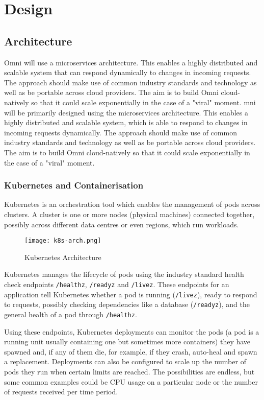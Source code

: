 \chapter{Design}
\label{cha:design}

\section{Architecture}
\label{sec:design-architecture}
Omni will use a microservices architecture. This enables a highly distributed and scalable system that can respond dynamically to changes in incoming requests.
The approach should make use of common industry standards and technology as well as be portable across cloud providers. The aim is to build Omni cloud-natively so that it could scale exponentially in the case of a "viral" moment.
mni will be primarily designed using the microservices architecture. This enables a highly distributed and scalable system, which is able to respond to changes in incoming requests dynamically. 
The approach should make use of common industry standards and technology as well as be portable across cloud providers. The aim is to build Omni cloud-natively so that it could scale exponentially in the case of a "viral" moment.

\subsection{Kubernetes and Containerisation}
\label{sec:design-system-kubernetes}
Kubernetes is an orchestration tool which enables the management of pods across clusters. A cluster is one or more nodes (physical machines) connected together, possibly across different data centres or even regions, which run workloads.


\begin{figure}[htbp]
\texttt{[image: k8s-arch.png]}
\centering
\caption{Kubernetes Architecture}
\end{figure}

Kubernetes manages the lifecycle of pods using the industry standard health check endpoints \texttt{/healthz}, \texttt{/readyz} and \texttt{/livez}. These endpoints for an application tell Kubernetes whether a pod is running (\texttt{/livez}), ready to respond to requests, possibly checking dependencies like a database (\texttt{/readyz}), and the general health of a pod through \texttt{/healthz}.

Using these endpoints, Kubernetes deployments can monitor the pods (a pod is a running unit usually containing one but sometimes more containers) they have spawned and, if any of them die, for example, if they crash, auto-heal and spawn a replacement.
Deployments can also be configured to scale up the number of pods they run when certain limits are reached. The possibilities are endless, but some common examples could be CPU usage on a particular node or the number of requests received per time period.

